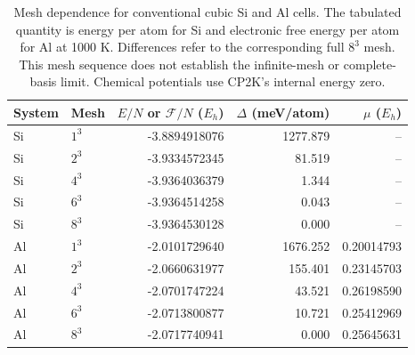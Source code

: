 \begin{table}[htbp]
\centering\small\setlength{\tabcolsep}{4pt}
\caption{Mesh dependence for conventional cubic Si and Al cells. The tabulated quantity is energy per atom for Si and electronic free energy per atom for Al at 1000 K. Differences refer to the corresponding full $8^3$ mesh. This mesh sequence does not establish the infinite-mesh or complete-basis limit. Chemical potentials use CP2K's internal energy zero.}
\label{tab:mesh-validation}
\begin{tabular}{llrrr}
\toprule
System & Mesh & $E/N$ or $\mathcal F/N$ ($E_h$) & $\Delta$ (meV/atom) & $\mu$ ($E_h$) \\
\midrule
Si & $1^3$ & -3.8894918076 & 1277.879 & -- \\
Si & $2^3$ & -3.9334572345 & 81.519 & -- \\
Si & $4^3$ & -3.9364036379 & 1.344 & -- \\
Si & $6^3$ & -3.9364514258 & 0.043 & -- \\
Si & $8^3$ & -3.9364530128 & 0.000 & -- \\
Al & $1^3$ & -2.0101729640 & 1676.252 & 0.20014793 \\
Al & $2^3$ & -2.0660631977 & 155.401 & 0.23145703 \\
Al & $4^3$ & -2.0701747224 & 43.521 & 0.26198590 \\
Al & $6^3$ & -2.0713800877 & 10.721 & 0.25412969 \\
Al & $8^3$ & -2.0717740941 & 0.000 & 0.25645631 \\
\bottomrule
\end{tabular}
\end{table}
